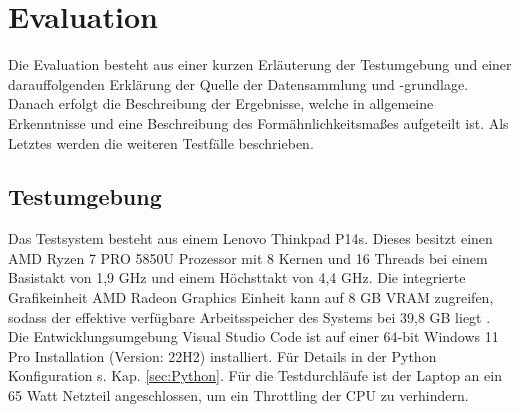 \chapter{Evaluation}
\label{ch:Evaluation} 
Die Evaluation besteht aus einer kurzen Erläuterung der Testumgebung und einer darauffolgenden Erklärung der Quelle der Datensammlung und -grundlage. Danach erfolgt die Beschreibung der Ergebnisse, welche in allgemeine Erkenntnisse und eine Beschreibung des Formähnlichkeitsmaßes aufgeteilt ist. Als Letztes werden die weiteren Testfälle beschrieben. 
\section{Testumgebung}{ \label{sec:testumgebung}
Das Testsystem besteht aus einem Lenovo Thinkpad P14s. Dieses besitzt einen AMD Ryzen 7 PRO 5850U Prozessor mit 8 Kernen und 16 Threads bei einem Basistakt von 1,9 GHz und einem Höchsttakt von 4,4 GHz. Die integrierte Grafikeinheit AMD Radeon Graphics Einheit kann auf 8 GB VRAM zugreifen, sodass der effektive verfügbare Arbeitsspeicher des Systems bei 39,8 GB liegt \citep{PSREF21}. Die Entwicklungsumgebung \glqq Visual Studio Code\grqq{} ist auf einer 64-bit Windows 11 Pro Installation (Version: 22H2) installiert. Für Details in der Python Konfiguration s. Kap. \ref{sec:Python}. Für die Testdurchläufe ist der Laptop an ein 65 Watt Netzteil angeschlossen, um ein Throttling der CPU zu verhindern. \\ }


